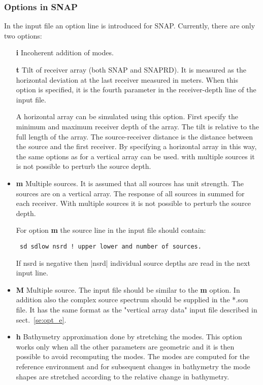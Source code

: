 \documentclass{saclantc}
\begin{document}
\subsubsection{Options in SNAP}
In the input file  an option line is introduced for {\sf SNAP}. 
Currently, there are only two options:
\begin{itemize}
 \item[\bf i]     Incoherent addition of modes.
 \item[\bf t] Tilt of receiver array (both {\sf SNAP} and {\sf SNAPRD}). 
It is measured
as the horizontal deviation at the last receiver measured in
meters. When this option is specified, it is the fourth parameter in
the receiver-depth line of the input file.  

A horizontal array can be simulated using this option. First specify
the minimum and maximum receiver depth of the array. The tilt
is relative to the full length of the array. The source-receiver distance
is the distance between the source and the first receiver. By
specifying a horizontal array in this way, the same options as for a
vertical array can be used.
with multiple sources it is not possible to perturb the source depth.

\item {\bf m} Multiple sources.
It is assumed that all sources has unit strength. The sources are on a
vertical array.  The response of all sources in summed for each
receiver. With multiple sources it is not possible to perturb the source depth.


For option {\bf m}  the source line in the input file should
contain:

{\tt
sd sdlow  nsrd          ! upper lower and number of sources.
}

If nsrd is negative then |nsrd| individual source depths are read in the next
input line.

\item{\bf M} Multiple source. The input file should be similar to the {\bf
m} option. In addition also the complex source spectrum should be
supplied in the *.sou file. It has the same format as the "vertical
array data" input file described in sect.\ \ref{se:opt_e}.

\item{\bf h} Bathymetry approximation done by stretching the modes.
This option works only when all the other parameters are geometric and  
it is then possible to avoid recomputing the modes. The modes are computed for the reference environment and for subsequent changes in bathymetry the mode shapes are stretched according to the relative change in bathymetry. 
 

\end{itemize}
\end{document}
